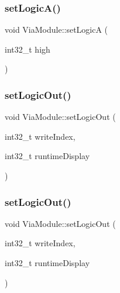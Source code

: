 \mbox{\label{class_via_module_a9add4c62e49aef8e8a122c923e31edc7}} 
\subsubsection{\texorpdfstring{set\+Logic\+A()}{setLogicA()}\hspace{0.1cm}{\footnotesize\ttfamily [2/2]}}
{\footnotesize\ttfamily void Via\+Module\+::set\+LogicA (\begin{DoxyParamCaption}\item[{int32\+\_\+t}]{high }\end{DoxyParamCaption})\hspace{0.3cm}{\ttfamily [inline]}}

\mbox{\label{class_via_module_a980dceea193632fc47c663dc2adcf7ca}} 
\subsubsection{\texorpdfstring{set\+Logic\+Out()}{setLogicOut()}\hspace{0.1cm}{\footnotesize\ttfamily [1/2]}}
{\footnotesize\ttfamily void Via\+Module\+::set\+Logic\+Out (\begin{DoxyParamCaption}\item[{int32\+\_\+t}]{write\+Index,  }\item[{int32\+\_\+t}]{runtime\+Display }\end{DoxyParamCaption})\hspace{0.3cm}{\ttfamily [inline]}}

\mbox{\label{class_via_module_a980dceea193632fc47c663dc2adcf7ca}} 
\subsubsection{\texorpdfstring{set\+Logic\+Out()}{setLogicOut()}\hspace{0.1cm}{\footnotesize\ttfamily [2/2]}}
{\footnotesize\ttfamily void Via\+Module\+::set\+Logic\+Out (\begin{DoxyParamCaption}\item[{int32\+\_\+t}]{write\+Index,  }\item[{int32\+\_\+t}]{runtime\+Display }\end{DoxyParamCaption})\hspace{0.3cm}{\ttfamily [inline]}}

